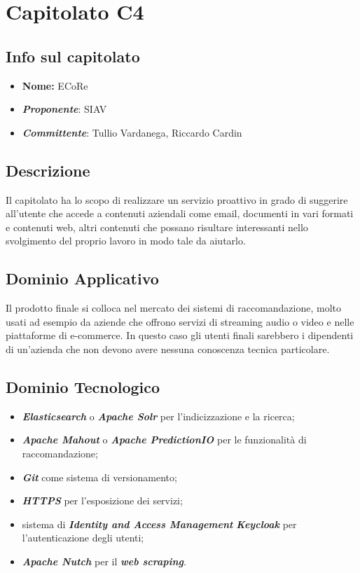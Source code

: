 
\section{Capitolato C4}
\subsection{Info sul capitolato}
\begin{itemize}
	\item \textbf{Nome:} ECoRe
	\item \textbf{\textit{Proponente}}: SIAV
	\item \textbf{\textit{Committente}}: Tullio Vardanega, Riccardo Cardin
\end{itemize}

\subsection{Descrizione}
Il capitolato ha lo scopo di realizzare un servizio proattivo in grado di suggerire all'utente che accede a contenuti aziendali come email, documenti in vari formati e contenuti web, altri contenuti che possano risultare interessanti nello svolgimento del proprio lavoro in modo tale da aiutarlo. 

\subsection{Dominio Applicativo}
Il prodotto finale si colloca nel mercato dei sistemi di raccomandazione, molto usati ad esempio da aziende che offrono servizi di streaming audio o video e nelle piattaforme di e-commerce. In questo caso gli utenti finali sarebbero i dipendenti di un'azienda che non devono avere nessuna conoscenza tecnica particolare. 

\subsection{Dominio Tecnologico}
\begin{itemize}
	\item \textit{\textbf{Elasticsearch}} o \textbf{\textit{Apache Solr}} per l'indicizzazione e la ricerca;
	\item \textbf{\textit{Apache Mahout}} o \textbf{\textit{Apache PredictionIO}} per le funzionalità di raccomandazione;
	\item \textbf{\textit{Git}} come sistema di versionamento;
	\item \textbf{\textit{HTTPS}} per l'esposizione dei servizi;
	\item sistema di \textbf{\textit{Identity and Access Management}} \textbf{\textit{Keycloak}} per l'autenticazione degli utenti;
	\item \textbf{\textit{Apache Nutch}} per il \textbf{\textit{web scraping}}.
\end{itemize}

